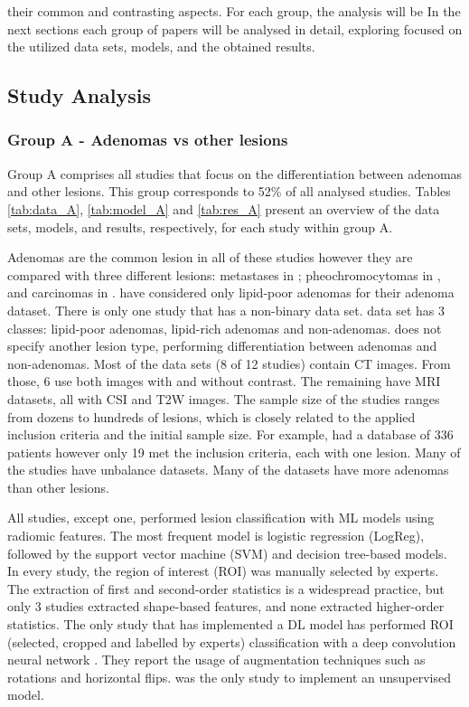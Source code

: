 \documentclass{article}
\begin{document}
their common and contrasting aspects. For each group, the analysis will be
In the next sections each group of papers will be analysed in detail, exploring
focused on the utilized data sets, models, and the obtained results.

\subsection{Study Analysis}

\subsubsection{Group A - Adenomas vs other lesions}

Group A comprises all studies that focus on the differentiation between adenomas
and other lesions. This group corresponds to 52\% of all analysed studies.
Tables \ref{tab:data_A}, \ref{tab:model_A} and \ref{tab:res_A} present an
overview of the data sets, models, and results, respectively, for each study
within group A.

Adenomas are the common lesion in all of these studies however
they are compared with three different lesions: metastases in
\cite{Schieda2017,Tu2018,Tu2020}; pheochromocytomas in \cite{Yi20181,Yi2018,
    Liu2022,Liu2021}, and carcinomas in \cite{Elmohr2019, Torresan2021, Ho2019}.
\cite{Tu2020, Yi2018, Yi20181, Liu2022} have considered only lipid-poor adenomas
for their adenoma dataset. There is only one study that has a non-binary data
set. \cite{Romeo2018} data set has 3 classes: lipid-poor adenomas, lipid-rich
adenomas and non-adenomas. \cite{Kusunoki2022} does not specify another lesion
type, performing differentiation between adenomas and non-adenomas. Most of the
data sets (8 of 12 studies) contain CT images. From those, 6 use both images
with and without contrast. The remaining have MRI datasets, all with CSI and T2W
images. The sample size of the studies ranges from dozens to hundreds of
lesions, which is closely related to the applied inclusion criteria and the
initial sample size. For example, \cite{Torresan2021} had a database of 336
patients however only 19 met the inclusion criteria, each with one lesion. Many
of the studies have unbalance datasets. Many of the datasets have more adenomas
than other lesions.

All studies, except one, performed lesion classification
with ML models using radiomic features. The most frequent model is logistic
regression (LogReg), followed by the support vector machine (SVM) and decision
tree-based models. In every study, the region of interest (ROI) was manually
selected by experts. The extraction of first and second-order statistics is a
widespread practice, but only 3 studies extracted shape-based features, and none
extracted higher-order statistics. The only study that has implemented a DL
model has performed ROI (selected, cropped and labelled by experts)
classification with a deep convolution neural network \cite{Kusunoki2022}. They
report the usage of augmentation techniques such as rotations and horizontal
flips. \cite{Torresan2021} was the only study to implement an unsupervised
model.
\end{document}
